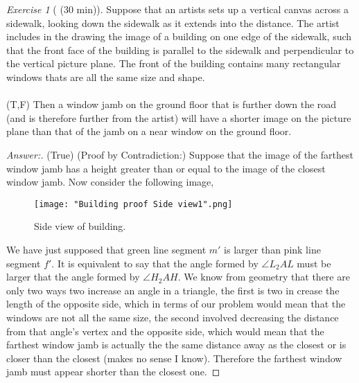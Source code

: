 \documentclass[12pt]{amsart}
\theoremstyle{remark}
\newtheorem*{exercise}{Exercise}%
\theoremstyle{mycomment}
\begin{document}
\begin{exercise}[ (30 min)] Suppose that an artists sets up a vertical canvas across a sidewalk, looking down the sidewalk as it extends into the distance. The artist includes in the drawing the image of a building on one edge of the sidewalk, such that the front face of the building is parallel to the sidewalk and perpendicular to the vertical picture plane. The front of the building contains many rectangular windows thats are all the same size and shape.\\\\
(T,F) Then a window jamb on the ground floor that is further down the road (and is therefore further from the artist) will have a shorter image on the picture plane than that of the jamb on a near window on the ground floor.
\begin{proof}[Answer:] (True) (Proof by Contradiction:) Suppose that the image of the farthest window jamb has a height greater than or equal to the image of the closest window jamb. Now consider the following image,


\begin{figure}[ht]
\caption{Side view of building.}
\centering
\texttt{[image: "Building proof Side view1".png]}
\end{figure}



We have just supposed that green line segment $m'$ is larger than pink line segment $f'$. It is equivalent to say that the angle formed by $\angle L_2AL$ must be larger that the angle formed by $\angle H_2AH$. We know from geometry that there are only two ways two increase an angle in a triangle, the first is two in crease the length of the opposite side, which in terms of our problem would mean that the windows are not all the same size, the second involved decreasing the distance from that angle's vertex and the opposite side, which would mean that the farthest window jamb is actually the the same distance away as the closest or is closer than the closest (makes no sense I know). Therefore the farthest window jamb must appear shorter than the closest one.
\end{proof}
\end{exercise}
\end{document}
